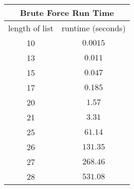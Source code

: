 \begin{tabular}{c|c}
    \hline
    \multicolumn{2}{|c|}{Brute Force Run Time} \\
    \hline
    length of list & runtime (seconds)         \\
    \hline
    10             & $0.0015$                  \\
    13             & $0.011$                   \\
    15             & $0.047$                   \\
    17             & $0.185$                   \\
    20             & $1.57$                    \\
    21             & $3.31$                    \\
    25             & $61.14$                   \\
    26             & $131.35$                  \\
    27             & $268.46$                  \\
    28             & $531.08$                  \\
    \hline
\end{tabular}